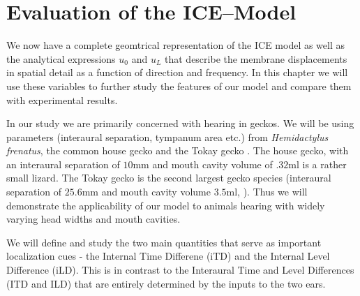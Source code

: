 \chapter{Evaluation of the ICE--Model}\label{modelanalysis}
We now have a complete geomtrical representation of the ICE model as well as
 the analytical expressions $u_0$ and $u_L$ that describe the membrane displacements
in spatial detail as a function of direction and frequency. In this chapter we will use these variables
to further study the features of our model and compare them with experimental results.

In our study we are primarily concerned with hearing in geckos. We will be using
parameters (interaural separation, tympanum area etc.) from \textit{Hemidactylus frenatus}, the common house gecko
\cite{dalsgaardmanley2}
and the Tokay gecko \cite{dalsgaardtangcarr}. The house gecko, with an interaural separation of $10$mm and mouth cavity volume of $.32$ml is a rather
small lizard. The Tokay gecko is the second largest gecko species (interaural separation of $25.6$mm and mouth cavity volume $3.5$ml, \cite{dalsgaardtangcarr}).
Thus we will demonstrate the applicability of our model to animals hearing with widely varying head widths and mouth cavities. 

We will define and study the two main quantities that serve as important localization
cues - the Internal Time Differene (iTD) and the Internal Level Difference (iLD). This
is in contrast to the Interaural Time and Level Differences (ITD and ILD) that are
entirely determined by the inputs to the two ears.
